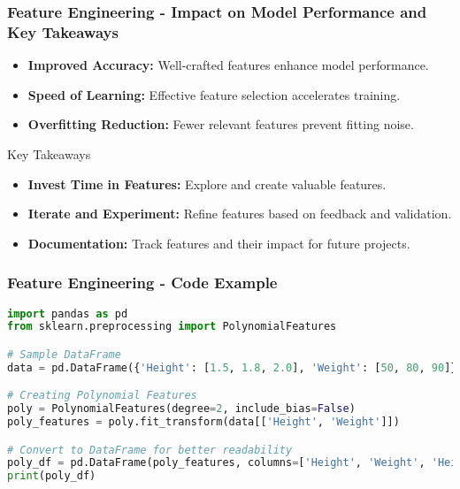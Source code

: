 \documentclass[aspectratio=169]{beamer}
\begin{document}
\begin{frame}[fragile]
    \frametitle{Feature Engineering - Impact on Model Performance and Key Takeaways}
    \begin{itemize}
        \item \textbf{Improved Accuracy:} Well-crafted features enhance model performance.
        \item \textbf{Speed of Learning:} Effective feature selection accelerates training.
        \item \textbf{Overfitting Reduction:} Fewer relevant features prevent fitting noise.
    \end{itemize}
    \begin{block}{Key Takeaways}
        \begin{itemize}
            \item \textbf{Invest Time in Features:} Explore and create valuable features.
            \item \textbf{Iterate and Experiment:} Refine features based on feedback and validation.
            \item \textbf{Documentation:} Track features and their impact for future projects.
        \end{itemize}
    \end{block}
\end{frame}

\begin{frame}[fragile]
    \frametitle{Feature Engineering - Code Example}
    \begin{lstlisting}[language=Python]
import pandas as pd
from sklearn.preprocessing import PolynomialFeatures

# Sample DataFrame
data = pd.DataFrame({'Height': [1.5, 1.8, 2.0], 'Weight': [50, 80, 90]})

# Creating Polynomial Features
poly = PolynomialFeatures(degree=2, include_bias=False)
poly_features = poly.fit_transform(data[['Height', 'Weight']])

# Convert to DataFrame for better readability
poly_df = pd.DataFrame(poly_features, columns=['Height', 'Weight', 'Height^2', 'Height*Weight', 'Weight^2'])
print(poly_df)
    \end{lstlisting}
\end{frame}
\end{document}
